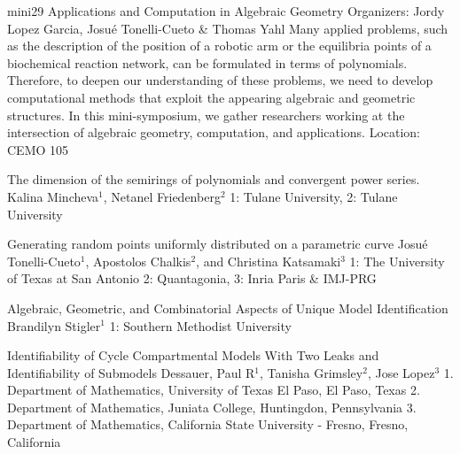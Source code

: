 \mini
{mini29}
{Applications and Computation in Algebraic Geometry}
{Organizers: Jordy Lopez Garcia, Josu\'e Tonelli-Cueto \& Thomas Yahl}
{Many applied problems, such as the description of the position of a robotic arm or the equilibria points of a biochemical reaction network, can be formulated in terms of polynomials. Therefore, to deepen our understanding of these problems, we need to develop computational methods that exploit the appearing algebraic and geometric structures. In this mini-symposium, we gather researchers working at the intersection of algebraic geometry, computation, and applications.}
{Location: CEMO 105}

\begin{talks}
\item\talk
{The dimension of the semirings of polynomials and convergent power series.}
{Kalina Mincheva$^1$, Netanel Friedenberg$^2$}
{1: Tulane University, 2: Tulane University}
\item\talk
{Generating random points uniformly distributed on a parametric curve}
{Josué Tonelli-Cueto$^{1}$, Apostolos Chalkis$^{2}$, and Christina Katsamaki$^{3}$}
{1: The University of Texas at San Antonio 2: Quantagonia, 3: Inria Paris \& IMJ-PRG}
\item\talk
{Algebraic, Geometric, and Combinatorial Aspects of Unique Model Identification}
{Brandilyn Stigler$^{1}$}
{1: Southern Methodist University}
\item\talk
{Identifiability of Cycle Compartmental Models With Two Leaks and Identifiability of Submodels}
{Dessauer, Paul R$^1$, Tanisha Grimsley$^2$, Jose Lopez$^3$}
{1. Department of Mathematics, University of Texas El Paso, El Paso, Texas 2. Department of Mathematics, Juniata College, Huntingdon, Pennsylvania 3. Department of Mathematics, California State University - Fresno, Fresno, California}
\end{talks}
\room
